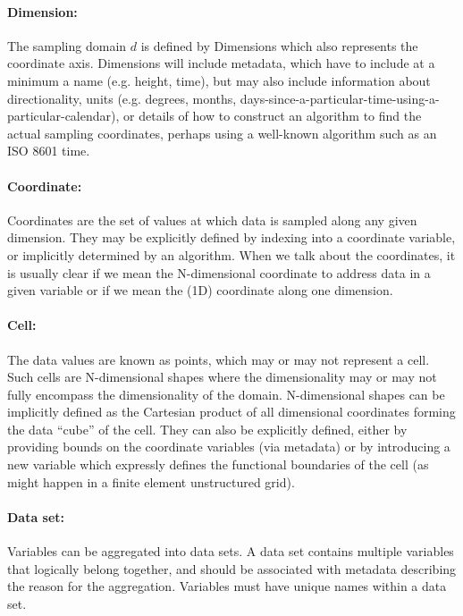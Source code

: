 \paragraph{Dimension:} The sampling domain $d$ is defined by Dimensions which also represents the coordinate axis. Dimensions will include metadata, which have to include at a minimum a name (e.g. height, time), but may also include information about directionality, units (e.g. degrees, months, days-since-a-particular-time-using-a-particular-calendar), or details of how to construct an algorithm to find the actual sampling coordinates, perhaps using a well-known algorithm such as an ISO 8601 time.

\paragraph{Coordinate:} Coordinates are the set of values at which data is sampled along any given dimension. They may be
explicitly defined by indexing into a coordinate variable, or implicitly determined by an algorithm. When we talk about the coordinates, it is usually clear if we mean the N-dimensional coordinate to address data in a given variable or if we mean the (1D) coordinate along one dimension.


\paragraph{Cell:} The data values are known as points, which may or may not represent a cell. Such cells are N-dimensional shapes where the dimensionality may or may not fully encompass the dimensionality of the domain.
N-dimensional shapes can be implicitly defined as the Cartesian product of all dimensional coordinates forming the data ``cube'' of the cell. They can also be explicitly defined, either by providing bounds on the coordinate variables (via metadata) or by introducing a new variable which expressly defines the functional boundaries of the cell (as might happen in a finite element unstructured grid).


\paragraph{Data set:} Variables can be aggregated into data sets. A data set contains multiple variables that logically belong together, and should be associated with metadata describing the reason for the aggregation.  Variables must have unique names within a data set.



